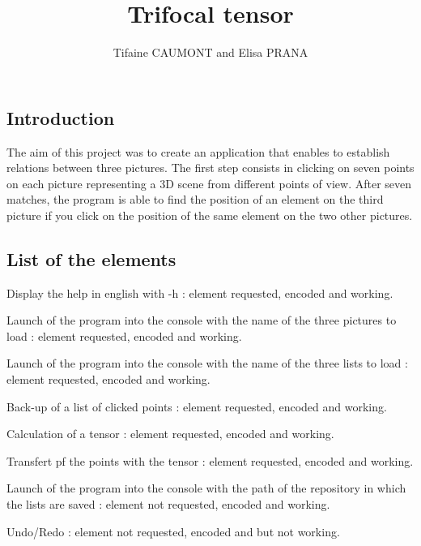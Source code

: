 \documentclass{report}
\begin{document}
\title{Trifocal tensor}
\author{Tifaine CAUMONT and Elisa PRANA}
\maketitle

\tableofcontents
\newpage

\textcolor{title}{\section*{Introduction}}
The aim of this project was to create an application that enables to establish relations between three pictures. The first step consists in clicking on seven points on each picture representing a 3D scene from different points of view. After seven matches, the program is able to find the position of an element on the third picture if you click on the position of the same element on the two other pictures. 

\textcolor{title}{\section{List of the elements}}

\begin{list}{•}{•}
\item 
Display the help in english with -h : element requested, encoded and working.  
\item
Launch of the program into the console with the name of the three pictures to load : element requested, encoded and working. 
\item
Launch of the program into the console with the name of the three lists to load : element requested, encoded and working. 
\item
Back-up of a list of clicked points : element requested, encoded and working.  
\item
Calculation of a tensor : element requested, encoded and working. 
\item
Transfert pf the points with the tensor : element requested, encoded and working.
\item 
Launch of the program into the console with the path of the repository in which the lists are saved : element not requested, encoded and working.  
\item 
Undo/Redo : element not requested, encoded and but not working.  

\end{list}
\end{document}
